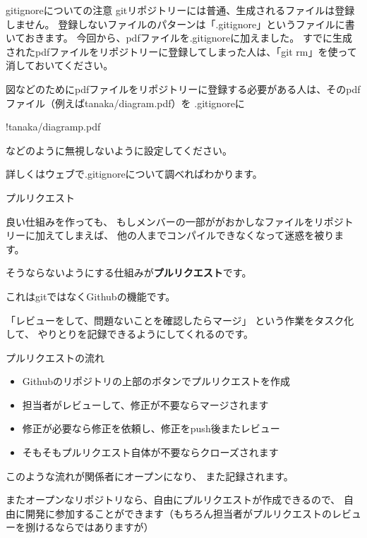 \documentclass[12pt, unicode]{beamer}
\begin{document}
\begin{frame}{gitignoreについての注意}
gitリポジトリーには普通、生成されるファイルは登録しません。
登録しないファイルのパターンは「.gitignore」というファイルに書いておきます。
今回から、pdfファイルを.gitignoreに加えました。
すでに生成されたpdfファイルをリポジトリーに登録してしまった人は、「git rm」を使って消しておいてください。

図などのためにpdfファイルをリポジトリーに登録する必要がある人は、そのpdfファイル（例えばtanaka/diagram.pdf）を
.gitignoreに

!tanaka/diagramp.pdf

などのように無視しないように設定してください。

詳しくはウェブで.gitignoreについて調べればわかります。


\end{frame}

\begin{frame}{プルリクエスト}

良い仕組みを作っても、
もしメンバーの一部ががおかしなファイルをリポジトリーに加えてしまえば、
他の人までコンパイルできなくなって迷惑を被ります。

そうならないようにする仕組みが\textbf{プルリクエスト}です。

これはgitではなくGithubの機能です。

「レビューをして、問題ないことを確認したらマージ」
という作業をタスク化して、
やりとりを記録できるようにしてくれるのです。

\end{frame}
\begin{frame}{プルリクエストの流れ}

\begin{itemize}
\item Githubのリポジトリの上部のボタンでプルリクエストを作成
\item 担当者がレビューして、修正が不要ならマージされます
\item 修正が必要なら修正を依頼し、修正をpush後またレビュー
\item そもそもプルリクエスト自体が不要ならクローズされます
\end{itemize}

このような流れが関係者にオープンになり、
また記録されます。

またオープンなリポジトリなら、自由にプルリクエストが作成できるので、
自由に開発に参加することができます（もちろん担当者がプルリクエストのレビューを捌けるならではありますが）

\end{frame}
\end{document}
